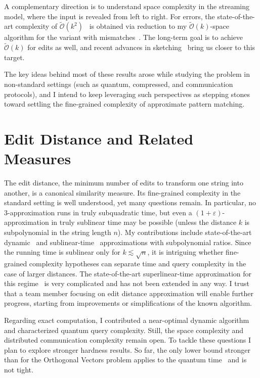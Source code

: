 \documentclass[a4paper,11pt]{article}
\newcommand{\eps}{\varepsilon}
\newcommand{\Ohtilde}{\tilde{\mathcal{O}}}
\begin{document}
A complementary direction is to understand space complexity in the streaming model, where the input is revealed from left to right. 
For errors, the state-of-the-art complexity of $\Ohtilde(k^2)$~\cite{BK23a} is obtained via reduction to my $\Ohtilde(k)$-space algorithm for the variant with mismatches~\cite{CKP19}. 
The long-term goal is to achieve $\Ohtilde(k)$ for edits as well, and recent advances in sketching~\cite{KS24} bring us closer to this target.  

The key ideas behind most of these results arose while studying the problem in non-standard settings (such as quantum, compressed, and communication protocols), and I intend to keep leveraging such perspectives as stepping stones toward settling the fine-grained complexity of approximate pattern matching.

\section{Edit Distance and Related Measures}

The edit distance, the minimum number of edits to transform one string into another, is a canonical similarity measure. 
Its fine-grained complexity in the standard setting is well understood, yet many questions remain. 
In particular, no $3$-approximation runs in truly subquadratic time, but even a $(1+\eps)$-approximation in truly sublinear time may be possible (unless the distance $k$ is subpolynomial in the string length $n$). 
My contributions include state-of-the-art dynamic~\cite{KMS23} and sublinear-time~\cite{GKKS22} approximations with subpolynomial ratios. 
Since the running time is sublinear only for $k \lesssim \sqrt{n}$, it is intriguing whether fine-grained complexity hypotheses can separate time and query complexity in the case of larger distances. 
The state-of-the-art superlinear-time approximation for this regime~\cite{AN20} is very complicated and has not been extended in any way.
I trust that a team member focusing on edit distance approximation will enable further progress, starting from improvements or simplifications of the known algorithm.

Regarding exact computation, I contributed a near-optimal dynamic algorithm~\cite{GK25} and characterized quantum query complexity. 
Still, the space complexity and distributed communication complexity remain open. 
To tackle these questions I plan to explore stronger hardness results. 
So far, the only lower bound stronger than for the Orthogonal Vectors problem applies to the quantum time~\cite{BPS21} and is not tight.  
\end{document}
